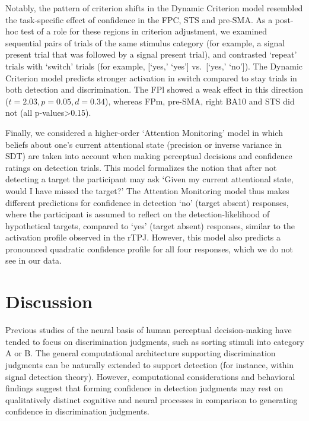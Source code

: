 \documentclass[12pt,twoside]{reedthesis}
\begin{document}
Notably, the pattern of criterion shifts in the Dynamic Criterion model resembled the task-specific effect of confidence in the FPC, STS and pre-SMA. As a post-hoc test of a role for these regions in criterion adjustment, we examined sequential pairs of trials of the same stimulus category (for example, a signal present trial that was followed by a signal present trial), and contrasted `repeat' trials with `switch' trials (for example, {[}`yes,' `yes'{]} vs.~{[}`yes,' `no'{]}). The Dynamic Criterion model predicts stronger activation in switch compared to stay trials in both detection and discrimination. The FPl showed a weak effect in this direction (\(t = 2.03, p=0.05, d = 0.34\)), whereas FPm, pre-SMA, right BA10 and STS did not (all p-values\textgreater0.15).

Finally, we considered a higher-order `Attention Monitoring' model in which beliefs about one's current attentional state (precision or inverse variance in SDT) are taken into account when making perceptual decisions and confidence ratings on detection trials. This model formalizes the notion that after not detecting a target the participant may ask `Given my current attentional state, would I have missed the target?' The Attention Monitoring model thus makes different predictions for confidence in detection `no' (target absent) responses, where the participant is assumed to reflect on the detection-likelihood of hypothetical targets, compared to `yes' (target absent) responses, similar to the activation profile observed in the rTPJ. However, this model also predicts a pronounced quadratic confidence profile for all four responses, which we do not see in our data.

\hypertarget{discussion-3}{%
\section{Discussion}\label{discussion-3}}

Previous studies of the neural basis of human perceptual decision-making have tended to focus on discrimination judgments, such as sorting stimuli into category A or B. The general computational architecture supporting discrimination judgments can be naturally extended to support detection (for instance, within signal detection theory). However, computational considerations and behavioral findings suggest that forming confidence in detection judgments may rest on qualitatively distinct cognitive and neural processes in comparison to generating confidence in discrimination judgments.
\end{document}
